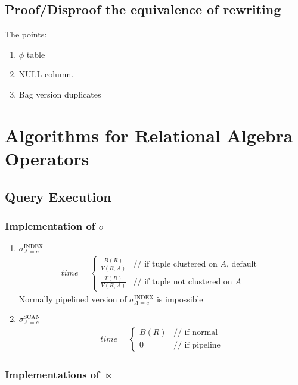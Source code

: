 \documentclass[a4paper]{report}
\begin{document}
\subsection{Proof/Disproof the equivalence of rewriting}
The  points: 
\begin{enumerate}
\item $\phi$ table
\item NULL column. 
\item Bag version duplicates
\end{enumerate}



\section{Algorithms for Relational Algebra Operators}
\subsection{Query Execution}\label{sec:queryExec}
\subsubsection{Implementation of $\sigma$}
\begin{enumerate}
\item $\sigma^\text{INDEX}_{A=c}$ 
\begin{eqnarray*}
time = \left\{ \begin{array}{rl}
  \frac{B(R)}{V(R, A)} &\text{// if tuple clustered on $A$, default }\\
  \frac{T(R)}{V(R, A)} &\text{// if tuple not clustered on $A$}
       \end{array} \right.
\end{eqnarray*}
Normally pipelined version of $\sigma^\text{INDEX}_{A=c}$ is impossible 
\item $\sigma^\text{SCAN}_{A=c}$
\begin{eqnarray*}
time = \left\{ \begin{array}{rl}
  B(R) &\text{// if normal }\\
  0 &\text{// if pipeline}
       \end{array} \right.
\end{eqnarray*}
\end{enumerate}
\subsubsection{Implementations of $\bowtie$}
\end{document}
